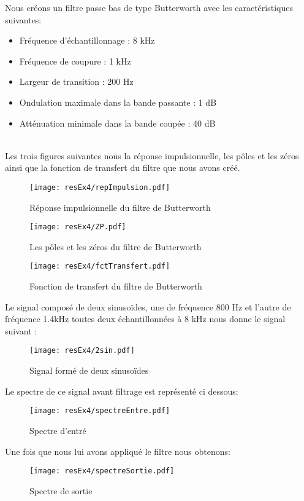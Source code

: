 Nous créons un filtre passe bas de type Butterworth avec les caractéristiques suivantes:\\
\begin{itemize}
\item Fréquence d'échantillonnage : 8 kHz
\item Fréquence de coupure : 1 kHz
\item Largeur de transition : 200 Hz
\item Ondulation maximale dans la bande passante : 1 dB
\item Atténuation minimale dans la bande coupée : 40 dB
\end{itemize}
~\\
Les trois figures suivantes nous la réponse impulsionnelle, les pôles et les zéros ainsi que la fonction de transfert du filtre que nous avons créé.

\begin{figure}[H]
\centering
\texttt{[image: resEx4/repImpulsion.pdf]}
\caption{Réponse impulsionnelle du filtre de Butterworth}
\end{figure}

\begin{figure}[H]
\centering
\texttt{[image: resEx4/ZP.pdf]}
\caption{Les pôles et les zéros du filtre de Butterworth}
\end{figure}

\begin{figure}[H]
\centering
\texttt{[image: resEx4/fctTransfert.pdf]}
\caption{Fonction de transfert du filtre de Butterworth}
\end{figure}

Le signal composé de deux sinusoïdes, une de fréquence 800 Hz et l'autre de fréquence 1.4kHz toutes deux échantillonnées à 8 kHz nous donne le signal suivant : 

\begin{figure}[H]
\centering
\texttt{[image: resEx4/2sin.pdf]}
\caption{Signal formé de deux sinusoïdes}
\end{figure}

Le spectre de ce signal avant filtrage est représenté ci dessous:

\begin{figure}[H]
\centering
\texttt{[image: resEx4/spectreEntre.pdf]}
\caption{Spectre d'entré}
\end{figure}

Une fois que nous lui avons appliqué le filtre nous obtenons:

\begin{figure}[H]
\centering
\texttt{[image: resEx4/spectreSortie.pdf]}
\caption{Spectre de sortie}
\end{figure}

